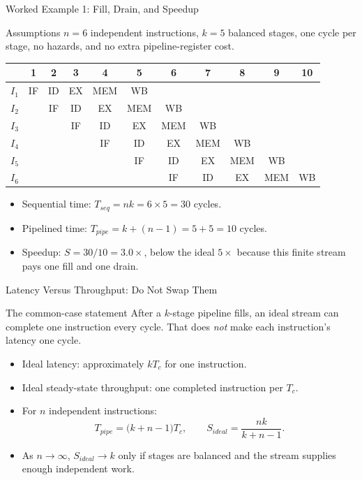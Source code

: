 \documentclass[aspectratio=169]{beamer}
\begin{document}
\begin{frame}{Worked Example 1: Fill, Drain, and Speedup}
  \scriptsize
  \begin{exampleblock}{Assumptions}
    $n=6$ independent instructions, $k=5$ balanced stages, one cycle per
    stage, no hazards, and no extra pipeline-register cost.
  \end{exampleblock}
  \begin{center}
    \begin{tabular}{@{}c|cccccccccc@{}}
      \toprule
      & 1 & 2 & 3 & 4 & 5 & 6 & 7 & 8 & 9 & 10\\
      \midrule
      $I_1$ & IF & ID & EX & MEM & WB & & & & &\\
      $I_2$ & & IF & ID & EX & MEM & WB & & & &\\
      $I_3$ & & & IF & ID & EX & MEM & WB & & &\\
      $I_4$ & & & & IF & ID & EX & MEM & WB & &\\
      $I_5$ & & & & & IF & ID & EX & MEM & WB &\\
      $I_6$ & & & & & & IF & ID & EX & MEM & WB\\
      \bottomrule
    \end{tabular}
  \end{center}
  \begin{itemize}
    \item Sequential time: $T_{seq}=nk=6\times5=30$ cycles.
    \item Pipelined time: $T_{pipe}=k+(n-1)=5+5=10$ cycles.
    \item Speedup: $S=30/10=3.0\times$, below the ideal $5\times$ because
      this finite stream pays one fill and one drain.
  \end{itemize}
\end{frame}

\begin{frame}{Latency Versus Throughput: Do Not Swap Them}
  \begin{block}{The common-case statement}
    After a $k$-stage pipeline fills, an ideal stream can complete one
    instruction every cycle. That does \emph{not} make each instruction's
    latency one cycle.
  \end{block}
  \begin{itemize}
    \item Ideal latency: approximately $kT_c$ for one instruction.
    \item Ideal steady-state throughput: one completed instruction per $T_c$.
    \item For $n$ independent instructions:
      \[
        T_{pipe}=\bigl(k+n-1\bigr)T_c,\qquad
        S_{ideal}=\frac{nk}{k+n-1}.
      \]
    \item As $n\to\infty$, $S_{ideal}\to k$ only if stages are balanced and
      the stream supplies enough independent work.
  \end{itemize}
\end{frame}
\end{document}
